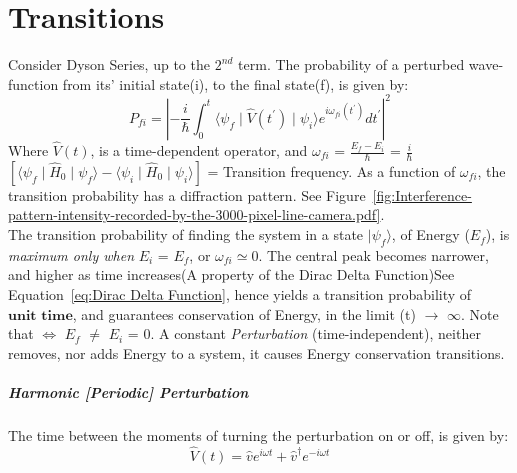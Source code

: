 \documentclass[a4paper, 10pt, onepage]{elegantbook}
\begin{document}
{\chapter{Transitions}

Consider Dyson Series, up to the $2^{nd}$ term. The probability of a perturbed wave-function from its' initial state(i), to the final state(f), is given by:
\begin{equation}
P_{fi} = \left| - \frac{i}{\hbar} \int_{0}^t \langle \psi_f \mid \hat V (t^{\prime}) \mid \psi_i \rangle e^{i \omega_{fi} (t^{\prime})} dt^{\prime} \right|^2
\end{equation}
Where $\hat V(t)$, is a time-dependent operator, and $\omega_{fi}$ = $\frac{E_f -  E_i}{\hbar}$ = $\frac{i}{\hbar}$ $\left[\langle \psi_f \mid \hat H_0 \mid \psi_f \rangle - \langle \psi_i \mid \hat H_0 \mid \psi_i \rangle \right]$ = Transition frequency. As a function of $\omega_{fi}$, the transition probability has a diffraction pattern. See Figure~\ref{fig:Interference-pattern-intensity-recorded-by-the-3000-pixel-line-camera.pdf}.  \\
The transition probability of finding the system in a state $\mid \psi_f \rangle$, of Energy ($E_f$), is \emph{maximum only when} $E_i$ = $E_f$, or $\omega_{fi} \simeq 0$. The central peak becomes narrower, and higher as time increases(A property of the Dirac Delta Function)See Equation~\ref{eq:Dirac Delta Function}, hence yields a transition probability of $\mathbf{\textbf{unit time}}$, and guarantees conservation of Energy, in the limit (t) $\rightarrow$ $\infty$. Note that $\iff$ $E_f$ $\neq$ $E_i$ = $0$. A constant \emph{Perturbation} (time-independent), neither removes, nor adds Energy to a system, it causes Energy conservation transitions.













\paragraph{Harmonic [Periodic] Perturbation}
\noindent

The time between the moments of turning the perturbation on or off, is given by:
\begin{equation}
\hat V (t) = \hat v e^{i \omega t} + \hat v^{\dagger} e^{ - i \omega t}
\end{equation}

}
\end{document}
